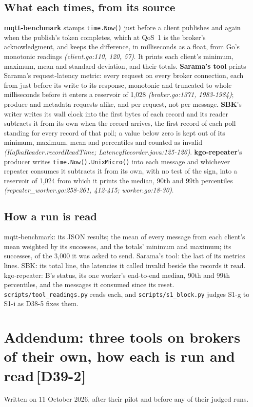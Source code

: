\documentclass[11pt]{article}
\newcommand{\gl}[1]{{\color{soft}\itshape\small (#1)}}
\newcommand{\chgold}[1]{\,{\color{oldcol}\bfseries\footnotesize[#1]}}
\begin{document}
\subsection*{What each times, from its source}
\textbf{mqtt-benchmark} stamps \texttt{time.Now()} just before a client publishes and again when
the publish's token completes, which at QoS~1 is the broker's acknowledgment, and keeps the
difference, in milliseconds as a float, from Go's monotonic readings \gl{client.go:110, 120, 57}.
It prints each client's minimum, maximum, mean and standard deviation, and their totals.
\textbf{Sarama's tool} prints Sarama's request-latency metric: every request on every broker
connection, each from just before its write to its response, monotonic and truncated to whole
milliseconds before it enters a reservoir of 1,028 \gl{broker.go:1371, 1983-1984}; produce and
metadata requests alike, and per request, not per message. \textbf{SBK}'s writer writes its wall
clock into the first bytes of each record and its reader subtracts it from its own when the record
arrives, the first record of each poll standing for every record of that poll; a value below zero
is kept out of its minimum, maximum, mean and percentiles and counted as invalid
\gl{KafkaReader.recordReadTime; LatencyRecorder.java:125-126}. \textbf{kgo-repeater}'s producer
writes \texttt{time.Now().UnixMicro()} into each message and whichever repeater consumes it subtracts
it from its own, with no test of the sign, into a reservoir of 1,024 from which it prints the
median, 90th and 99th percentiles \gl{repeater\_worker.go:258-261, 412-415; worker.go:18-30}.

\subsection*{How a run is read}
mqtt-benchmark: its JSON results; the mean of every message from each client's mean weighted by
its successes, and the totals' minimum and maximum; its successes, of the 3,000 it was asked to
send. Sarama's tool: the last of its metrics lines. SBK: its total line, the latencies it called
invalid beside the records it read. kgo-repeater: B's status, its one worker's end-to-end median,
90th and 99th percentiles, and the messages it consumed since its reset. \texttt{scripts/tool\_readings.py}
reads each, and \texttt{scripts/s1\_block.py} judges S1-g to S1-i as D38-5 fixes them.

\section[Addendum: three tools on brokers of their own]{Addendum: three tools on brokers of their own, how each is run and read\protect\chgold{D39-2}}\label{sec:addendum-v39}
Written on 11 October 2026, after their pilot and before any of their judged runs.
\end{document}
